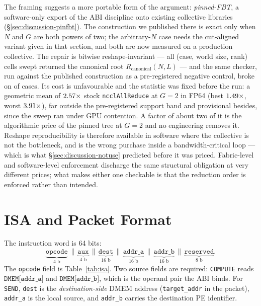 \documentclass[journal,10pt]{IEEEtran}
\theoremstyle{plain}
\theoremstyle{definition}
\theoremstyle{remark}
\newcommand{\Rcan}{\ensuremath{R_{\mathrm{canonical}}}}
\newcommand{\sv}[1]{\texttt{#1}}
\begin{document}
The framing suggests a more portable form of the argument: \emph{pinned-FBT},
a software-only export of the ABI discipline onto existing collective
libraries (\S\ref{sec:discussion-pinfbt}). The construction we published there
is exact only when $N$ and $G$ are both powers of two; the arbitrary-$N$ case
needs the cut-aligned variant given in that section, and both are now measured
on a production collective. The repair is bitwise reshape-invariant --- all
\PinCells{} (case, world size, rank) cells swept returned the canonical root
$\Rcan(N,L)$ --- and the same checker, run against the published construction
as a pre-registered negative control, broke on \PinNegFired{} of
\PinNegCases{} cases. Its cost is unfavourable and the statistic was fixed
before the run: a geometric mean of $2.57\times$ stock
\texttt{ncclAllReduce} at $G{=}2$ in FP64 (best $1.49\times$, worst
$3.91\times$), far outside the pre-registered support band and
provisional besides, since the sweep ran under GPU contention. A factor of
about two of it is the algorithmic price of the pinned tree at $G{=}2$ and no
engineering removes it. Reshape reproducibility is therefore available in
software where the collective is not the bottleneck, and is the wrong purchase
inside a bandwidth-critical loop --- which
is what \S\ref{sec:discussion-notuse} predicted before it was priced.
Fabric-level and software-level enforcement discharge the same structural
obligation at very different prices; what makes either one checkable is that
the reduction order is enforced rather than intended.

\appendices
\section{ISA and Packet Format}\label{app:isa}

The instruction word is 64 bits:
\[
  \underbrace{\mathtt{opcode}}_{\text{4 b}}
  \,\|\, \underbrace{\mathtt{aux}}_{\text{4 b}}
  \,\|\, \underbrace{\mathtt{dest}}_{\text{16 b}}
  \,\|\, \underbrace{\mathtt{addr\_a}}_{\text{16 b}}
  \,\|\, \underbrace{\mathtt{addr\_b}}_{\text{16 b}}
  \,\|\, \underbrace{\mathtt{reserved}}_{\text{8 b}}.
\]
The \sv{opcode} field is Table~\ref{tab:isa}. Two source fields are
required: \texttt{COMPUTE} reads $\texttt{DMEM[addr\_a]}$ and
$\texttt{DMEM[addr\_b]}$, which is the operand pair the ABI binds. For
\texttt{SEND}, \sv{dest} is the \emph{destination-side} DMEM address
(\texttt{target\_addr} in the packet), \sv{addr\_a} is the local source, and
\sv{addr\_b} carries the destination PE identifier.
\end{document}
